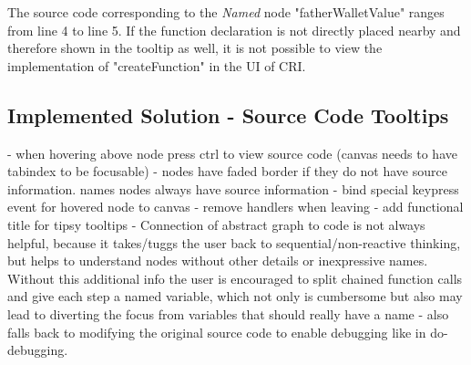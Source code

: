 The source code corresponding to the \emph{Named} node "fatherWalletValue" ranges from line 4 to line 5. If the function declaration is not directly placed nearby and therefore shown in the tooltip as well, it is not possible to view the implementation of "createFunction" in the UI of CRI. 

			
			
	\subsection{Implemented Solution - Source Code Tooltips}
	- when hovering above node press ctrl to view source code (canvas needs to have tabindex to be focusable)
	- nodes have faded border if they do not have source information. names nodes always have source information
	- bind special keypress event for hovered node to canvas
	- remove handlers when leaving
	- add functional title for tipsy tooltips
	- Connection of abstract graph to code is not always helpful, because it takes/tuggs the user back to sequential/non-reactive thinking, but helps to understand nodes without other details or inexpressive names. Without this additional info the user is encouraged to split chained function calls and give each step a named variable, which not only is cumbersome but also may lead to diverting the focus from variables that should really have a name - also falls back to modifying the original source code to enable debugging like in do-debugging.
	
